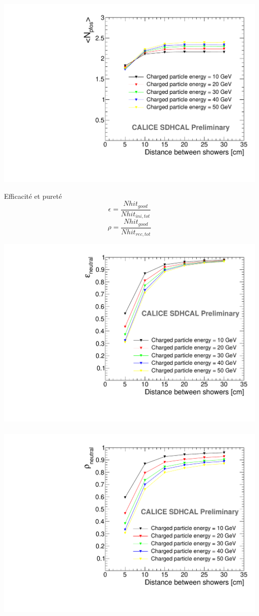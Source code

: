 \documentclass[8pt]{beamer}
\begin{document}
 
  \begin{frame}
  \frametitle{\secname}
  \framesubtitle{\subsecname}
    
    \begin{minipage}{0.49\linewidth}
      \begin{center}
        \includegraphics[width=0.8\linewidth]{OverlayEvent_NPfos.pdf}     
      \end{center}
    \end{minipage} \hfill
    \begin{minipage}{0.49\linewidth}
      \begin{block}{Efficacité et pureté}
        \begin{equation}
          \epsilon = \frac{Nhit_{good}}{Nhit_{ini,tot}}
        \end{equation}
        \begin{equation}
          \rho = \frac{Nhit_{good}}{Nhit_{rec,tot}}
        \end{equation}
      \end{block}
    \end{minipage}
    \begin{center}
      \includegraphics[width=0.4\linewidth]{OverlayEvent_NeutralEfficiency.pdf} ~~~~~~~~~~~~~~~~
      \includegraphics[width=0.4\linewidth]{OverlayEvent_NeutralPurity.pdf}     
    \end{center}
  \end{frame}
\end{document}
